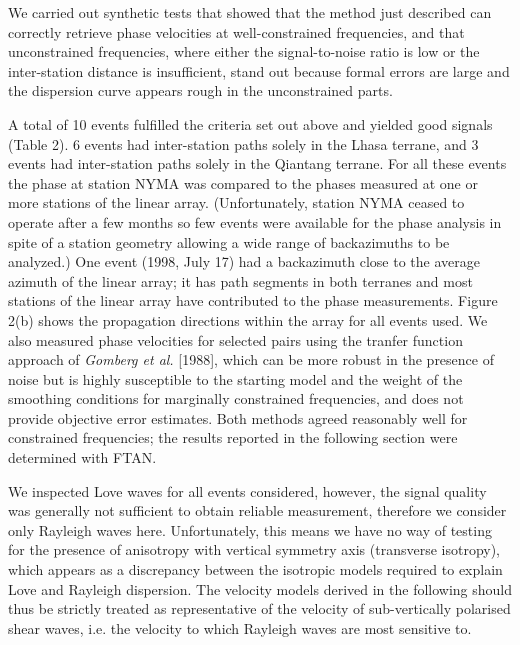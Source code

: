 \documentclass[12pt]{article}
\begin{document}
We carried out synthetic tests that showed that the method just described can correctly retrieve phase
velocities at well-constrained frequencies, and that unconstrained frequencies, where either the
signal-to-noise ratio is low or the inter-station distance is insufficient, stand out because formal errors
are large and the dispersion curve appears rough in the unconstrained parts.

A total of 10 events fulfilled the criteria set out above and yielded good signals (Table 2).  6 events had
inter-station paths solely in the Lhasa terrane, and 3 events had inter-station paths solely in the
Qiantang terrane.  For all these events the phase at station NYMA was compared to the phases measured at
one or more stations of the linear array. (Unfortunately, station NYMA ceased to operate after a few months
so few events were available for the phase analysis in spite of a station geometry allowing a wide range of
backazimuths to be analyzed.)  One event (1998, July 17) had a backazimuth close to the average azimuth of
the linear array; it has path segments in both terranes and most stations of the linear array have
contributed to the phase measurements.  Figure 2(b) shows the propagation directions within the array for
all events used.  We also measured phase velocities for selected pairs using the tranfer function approach
of {\it Gomberg et al.} [1988], which can be more robust in the presence of noise but is highly susceptible
to the starting model and the weight of the smoothing conditions for marginally constrained frequencies, and does not provide objective error estimates.
Both methods agreed reasonably well for constrained frequencies; the results reported in
the following section were determined with FTAN.

We inspected Love waves for all events considered, however, the signal quality was generally not sufficient
to obtain reliable measurement, therefore we consider only Rayleigh waves
here. Unfortunately, this means we have no way of testing for the presence
  of anisotropy with vertical symmetry axis (transverse isotropy), which
 appears as a discrepancy between the isotropic models required to explain Love and
 Rayleigh dispersion.  The velocity models derived in the following should thus
 be strictly treated as representative of the velocity of sub-vertically
 polarised shear waves, i.e. the velocity to which Rayleigh waves are most
 sensitive to.
\end{document}
